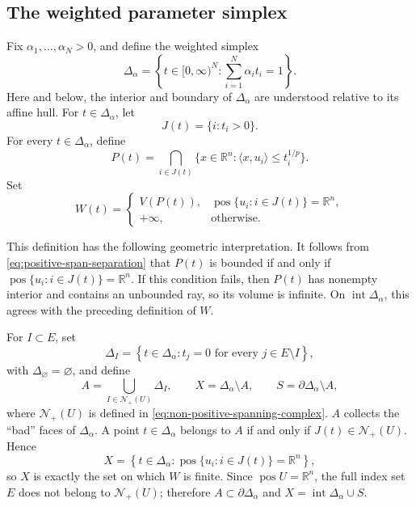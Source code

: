 \documentclass[12pt,reqno]{amsart}
\numberwithin{equation}{section}
\theoremstyle{remark}
\DeclareMathOperator{\pos}{pos}
\newcommand{\R}{\mathbb R}
\newcommand{\Ncal}{\mathcal N}
\begin{document}
\subsection{The weighted parameter simplex}
\label{subsec:weighted-parameter-simplex}

Fix $\alpha_1,\ldots,\alpha_N>0$, and define the weighted simplex
\begin{equation}\label{eq:weighted-simplex}
 \Delta_\alpha
 =\left\{t\in[0,\infty)^N:\sum_{i=1}^N\alpha_i t_i=1\right\}.
\end{equation}
Here and below, the interior and boundary of \(\Delta_\alpha\) are
understood relative to its affine hull. For $t\in\Delta_\alpha$, let
\begin{equation}
 J(t)=\{i:t_i>0\}.
\end{equation}
For every $t\in\Delta_\alpha$, define
\begin{equation}\label{eq:boundary-polytope}
	P(t)=\bigcap_{i\in J(t)}
	\{x\in\R^n:\langle x,u_i\rangle\leq t_i^{1/p}\}.
\end{equation}
Set
\begin{equation}\label{eq:parameter-volume-functional}
	W(t)=
	\begin{cases}
		V(P(t)),&\pos\{u_i:i\in J(t)\}=\R^n,\\
		+\infty,&\text{otherwise}.
	\end{cases}
\end{equation}

 
 This definition has the following geometric interpretation.
It follows from \eqref{eq:positive-span-separation} that \(P(t)\) is
bounded if and only if
\(\pos\{u_i:i\in J(t)\}=\R^n\). If this condition fails, then
\(P(t)\) has nonempty interior and contains an unbounded ray, so its
volume is infinite. On \(\operatorname{int}\Delta_\alpha\), this agrees with the preceding
definition of \(W\).


For \(I\subset E\), set
\[
\Delta_I
=
\left\{
t\in\Delta_\alpha:
t_j=0\text{ for every }j\in E\setminus I
\right\},
\]
with \(\Delta_\varnothing=\varnothing\), and define
\begin{equation}\label{eq:AXS}
	A=\bigcup_{I\in\Ncal_+(U)}\Delta_I,
	\qquad
	X=\Delta_\alpha\setminus A,
	\qquad
	S=\partial\Delta_\alpha\setminus A,
\end{equation}
where \(\Ncal_+(U)\) is defined in
\eqref{eq:non-positive-spanning-complex}.
\(A\) collects the ``bad'' faces of \(\Delta_\alpha\).
A point \(t\in\Delta_\alpha\) belongs to \(A\) if and only if
\(J(t)\in\Ncal_+(U)\). Hence
\begin{equation}\label{X}
X
=
\left\{
t\in\Delta_\alpha:
\pos\{u_i:i\in J(t)\}=\R^n
\right\},
\end{equation}
so \(X\) is exactly the set on which \(W\) is finite. Since
\(\pos U=\R^n\), the full index set \(E\) does not belong to
\(\Ncal_+(U)\); therefore \(A\subset\partial\Delta_\alpha\) and
\(X=\operatorname{int}\Delta_\alpha\cup S\).
\end{document}
